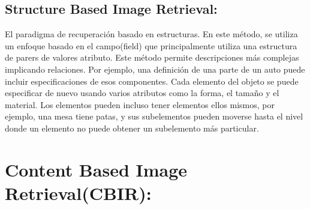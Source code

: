 \documentclass{llncs}
\begin{document}
\subsection{Structure Based Image Retrieval:}

El paradigma de recuperaci\'on basado en estructuras. En este m\'etodo, se utiliza un enfoque basado en el campo(field) que principalmente
utiliza una estructura de parers de valores atributo. Este m\'etodo permite descripciones m\'as complejas implicando relaciones. Por ejemplo,
una definici\'on de una parte de un auto puede incluir especificaciones de esos componentes. Cada elemento del objeto se puede especificar 
de nuevo usando varios atributos como la forma, el tama\~{n}o y el material. Los elementos pueden incluso tener elementos ellos mismos, por 
ejemplo, una mesa tiene patas, y sus subelementos pueden moverse hasta el nivel donde un elemento no puede obtener un subelemento m\'as particular.


\section{Content Based Image Retrieval(CBIR):}
\end{document}
